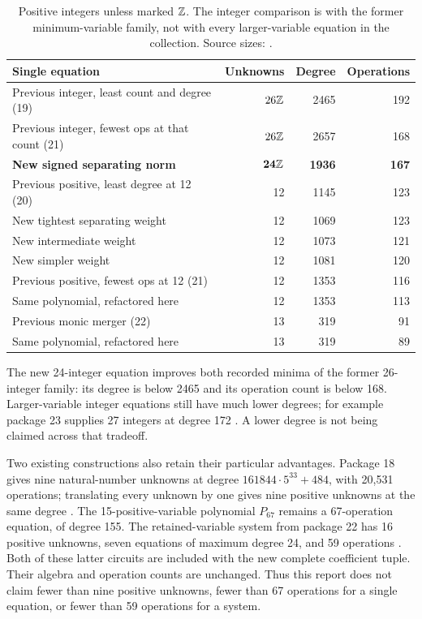 \begin{table}[htbp]
\centering\small
\begin{tabular}{p{2.31in}rrr}
\toprule
Single equation & Unknowns & Degree & Operations\\
\midrule
Previous integer, least count and degree (19) & $26\mathbb Z$ &2465&192\\
Previous integer, fewest ops at that count (21) &$26\mathbb Z$&2657&168\\
\textbf{New signed separating norm} &$\mathbf{24\mathbb Z}$&\textbf{1936}&\textbf{167}\\
\midrule
Previous positive, least degree at 12 (20)&12&1145&123\\
New tightest separating weight&12&1069&123\\
New intermediate weight&12&1073&121\\
New simpler weight&12&1081&120\\
\midrule
Previous positive, fewest ops at 12 (21)&12&1353&116\\
Same polynomial, refactored here&12&1353&113\\
\midrule
Previous monic merger (22)&13&319&91\\
Same polynomial, refactored here&13&319&89\\
\bottomrule
\end{tabular}
\caption{Positive integers unless marked $\mathbb Z$.  The integer comparison is
with the former minimum-variable family, not with every larger-variable
equation in the collection.  Source sizes: \cite{repo19,repo20,repo21,repo22}.}
\label{tab:comparison}
\end{table}

The new 24-integer equation improves both recorded minima of the former
26-integer family: its degree is below 2465 and its operation count is
below 168.  Larger-variable integer equations still have much lower
degrees; for example package 23 supplies 27 integers at degree 172
\cite{repo23}.  A lower degree is not being claimed across that tradeoff.

Two existing constructions also retain their particular advantages.
Package 18 gives nine natural-number unknowns at degree
$161844\cdot5^{33}+484$, with 20,531 operations; translating every unknown
by one gives nine positive unknowns at the same degree
\cite{repo18}.  The 15-positive-variable polynomial $P_{67}$ remains a
67-operation equation, of degree 155.  The retained-variable system from
package 22 has 16 positive unknowns, seven equations of maximum degree 24,
and 59 operations \cite{baseline67,retained59}.  Both of these latter
circuits are included with the new complete coefficient tuple.  Their
algebra and operation counts are unchanged.  Thus this report does not
claim fewer than nine positive unknowns, fewer than 67 operations for a
single equation, or fewer than 59 operations for a system.

